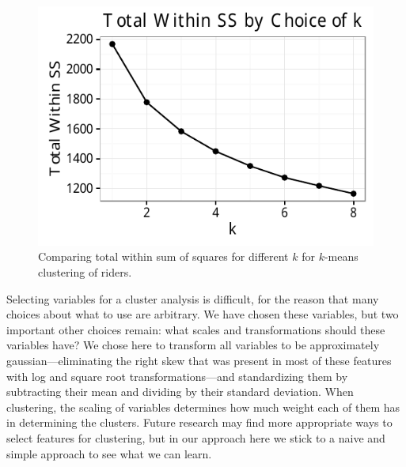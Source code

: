 \documentclass[12pt,twoside]{reedthesis}
\begin{document}
  \begin{figure}[tbh]
  \centering
  \includegraphics[angle = 0,scale = 0.8]{figure/choice_k.pdf}
  \caption[Comparing total within sum of squares for different $k$ for $k$-means clustering of riders]{\normalsize{Comparing total within sum of squares for different $k$ for $k$-means clustering of riders.}}
  \label{fig:choosing_k}
  \end{figure}
  
  Selecting variables for a cluster analysis is difficult, for the reason
  that many choices about what to use are arbitrary. We have chosen these
  variables, but two important other choices remain: what scales and
  transformations should these variables have? We chose here to transform
  all variables to be approximately gaussian---eliminating the right skew
  that was present in most of these features with log and square root
  transformations---and standardizing them by subtracting their mean and
  dividing by their standard deviation. When clustering, the scaling of
  variables determines how much weight each of them has in determining the
  clusters. Future research may find more appropriate ways to select
  features for clustering, but in our approach here we stick to a naive
  and simple approach to see what we can learn.
  
\end{document}
